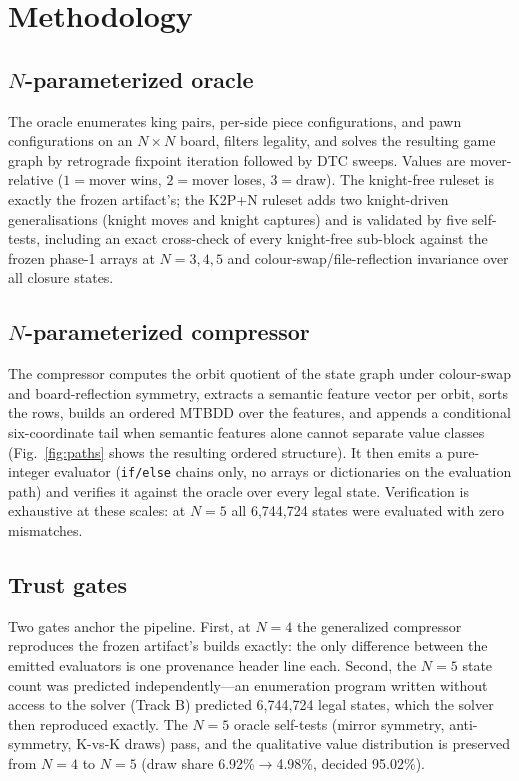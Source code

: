 \documentclass[conference]{IEEEtran}
\begin{document}
\section{Methodology}
\label{sec:method}

\subsection{$N$-parameterized oracle}
The oracle enumerates king pairs, per-side piece configurations, and pawn
configurations on an $N\times N$ board, filters legality, and solves the
resulting game graph by retrograde fixpoint iteration followed by DTC
sweeps. Values are mover-relative ($1{=}$mover wins, $2{=}$mover loses,
$3{=}$draw). The knight-free ruleset is exactly the frozen artifact's; the
K2P+N ruleset adds two knight-driven generalisations (knight moves and
knight captures) and is validated by five self-tests, including an exact
cross-check of every knight-free sub-block against the frozen phase-1 arrays
at $N=3,4,5$ and colour-swap/file-reflection invariance over all closure
states.

\subsection{$N$-parameterized compressor}
The compressor computes the orbit quotient of the state graph
under colour-swap and board-reflection symmetry, extracts a semantic feature
vector per orbit, sorts the rows, builds an ordered MTBDD over the features,
and appends a conditional six-coordinate tail when semantic features alone
cannot separate value classes (Fig.~\ref{fig:paths} shows the resulting
ordered structure). It then emits a pure-integer evaluator
(\texttt{if/else} chains only, no arrays or dictionaries on the evaluation
path) and verifies it against the oracle over every legal state. Verification
is exhaustive at these scales: at $N{=}5$ all 6{,}744{,}724 states were
evaluated with zero mismatches.

\subsection{Trust gates}
\label{sec:gates}
Two gates anchor the pipeline. First, at $N{=}4$ the generalized compressor
reproduces the frozen artifact's builds exactly: the only difference between
the emitted evaluators is one provenance header line each. Second, the
$N{=}5$ state count was predicted independently---an enumeration program
written without access to the solver (Track B) predicted 6{,}744{,}724 legal
states, which the solver then reproduced exactly. The $N{=}5$ oracle
self-tests (mirror symmetry, anti-symmetry, K-vs-K draws) pass, and the
qualitative value distribution is preserved from $N{=}4$ to $N{=}5$
(draw share 6.92\%$\to$4.98\%, decided 95.02\%).
\end{document}
